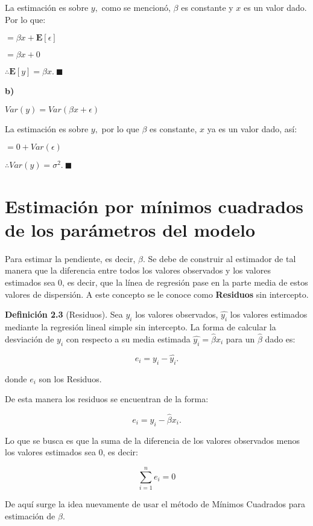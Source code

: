 \documentclass[
  a4paper,
  oneside,
  openany]{book}
\begin{document}
La estimación es sobre \(y,\) como se mencionó, \(\beta\) es constante y \(x\) es un valor dado. Por lo que:

\(=\beta x + \mathbf{E}[\epsilon]\)

\(=\beta x + 0\)

\(\therefore \mathbf{E}[y]= \beta x. \ \blacksquare\)

\textbf{b)}

\(Var(y)=Var(\beta x + \epsilon)\)

La estimación es sobre \(y,\) por lo que \(\beta\) es constante, \(x\) ya es un valor dado, así:

\(=0+Var(\epsilon)\)

\(\therefore Var(y)=\sigma^2.\ \blacksquare\)

\hypertarget{estimaciuxf3n-por-muxednimos-cuadrados-de-los-paruxe1metros-del-modelo-1}{%
\section{Estimación por mínimos cuadrados de los parámetros del modelo}\label{estimaciuxf3n-por-muxednimos-cuadrados-de-los-paruxe1metros-del-modelo-1}}

Para estimar la pendiente, es decir, \(\beta.\) Se debe de construir al estimador de tal manera que la diferencia entre todos los valores observados y los valores estimados sea 0, es decir, que la línea de regresión pase en la parte media de estos valores de dispersión. A este concepto se le conoce como \textbf{Residuos} sin intercepto.

\textbf{Definición 2.3} (Residuos). Sea \(y_{i}\) los valores observados, \(\hat{y_{i}}\) los valores estimados mediante la regresión lineal simple sin intercepto. La forma de calcular la desviación de \(y_{i}\) con respecto a su media estimada \(\hat{y_{i}}=\hat{\beta}x_{i}\) para un \(\hat{\beta}\) dado es:

\[e_{i}= y_{i}-\hat{y_{i}}.\]

donde \(e_{i}\) son los Residuos.

De esta manera los residuos se encuentran de la forma:

\[e_{i}=y_{i}-\hat{\beta}x_{i}.\]

Lo que se busca es que la suma de la diferencia de los valores observados menos los valores estimados sea 0, es decir:

\[\sum_{i=1}^{n}e_{i}=0\]

De aquí surge la idea nuevamente de usar el método de Mínimos Cuadrados para estimación de \(\beta.\)
\end{document}

